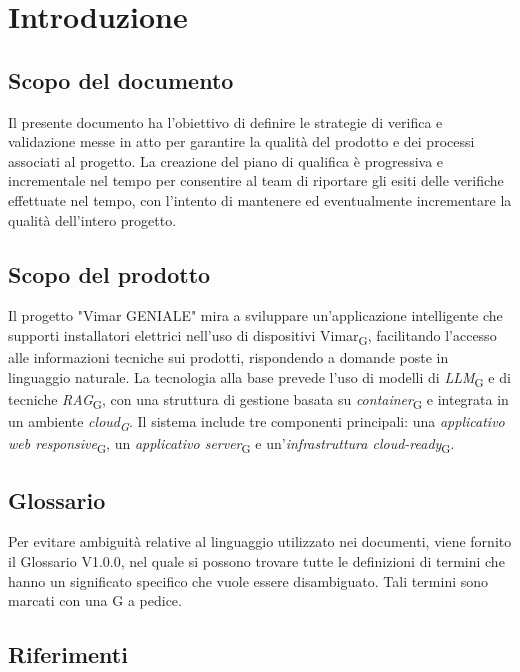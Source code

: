\section{Introduzione}
\subsection{Scopo del documento}
Il presente documento ha l'obiettivo di definire le strategie di verifica e validazione messe in atto per garantire la qualità del prodotto e dei processi associati al progetto. La creazione del piano di qualifica è progressiva e incrementale nel tempo
per consentire al team di riportare gli esiti delle verifiche effettuate nel tempo, con l'intento di mantenere ed eventualmente incrementare la qualità dell'intero progetto.
\subsection{Scopo del prodotto}
Il progetto "Vimar GENIALE" mira a sviluppare un'applicazione intelligente che supporti installatori elettrici nell'uso di dispositivi Vimar\textsubscript{G}, facilitando l'accesso alle informazioni tecniche sui prodotti, rispondendo a domande poste in linguaggio naturale.
La tecnologia alla base prevede l'uso di modelli di \textit{LLM}\textsubscript{G} e di tecniche \textit{RAG}\textsubscript{G}, con una struttura di gestione basata su \textit{container}\textsubscript{G} e integrata in un ambiente \textit{cloud\textsubscript{G}}.
Il sistema include tre componenti principali: una \textit{applicativo web responsive}\textsubscript{G}, un \textit{applicativo server}\textsubscript{G} e un'\textit{infrastruttura cloud-ready}\textsubscript{G}. 
\subsection{Glossario}
Per evitare ambiguità relative al linguaggio utilizzato nei documenti, viene fornito il Glossario V1.0.0, nel quale si possono trovare tutte le definizioni di termini che hanno un significato specifico che vuole essere disambiguato. Tali termini sono marcati con una G a pedice.
\subsection{Riferimenti}

